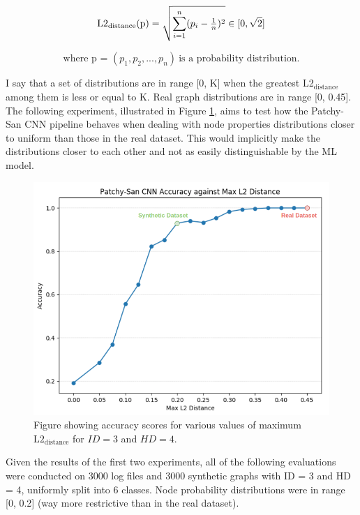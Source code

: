 \begin{equation} 
    \centering
    \text{L2}_\text{distance}\text{(p)} = \sqrt{\sum_{i=1}^{n} (p_i - \tfrac{1}{n})^2} \in [0,\sqrt{2}] \newline
\end{equation} \label{l2_distance}

$$ \text{where p = }(p_1, p_2, ..., p_n) \ \text{is a probability distribution.} $$ 

I say that a set of distributions are in range [0, K] when the greatest L2$_{\text{distance}}$ among them is less or equal to K. Real graph distributions are in range [0, 0.45]. The following experiment, illustrated in Figure \ref{l2_dist}, aims to test how the Patchy-San CNN pipeline behaves when dealing with node properties distributions closer to uniform than those in the real dataset. This would implicitly make the distributions closer to each other and not as easily distinguishable by the ML model. 

\begin{figure}[H]
  \centering
  \centerline{\includegraphics[scale=0.3]{Images/l2_dist.png}}
  \caption{ Figure showing accuracy scores for various values of maximum $\text{L2}_{\text{distance}}$ for $ID = 3$ and $HD = 4$.}
  \label{l2_dist}
\end{figure}

Given the results of the first two experiments, all of the following evaluations were conducted on 3000 log files and 3000 synthetic graphs with ID = 3 and HD = 4, uniformly split into 6 classes. Node probability distributions were in range [0, 0.2] (way more restrictive than in the real dataset). \smallskip

